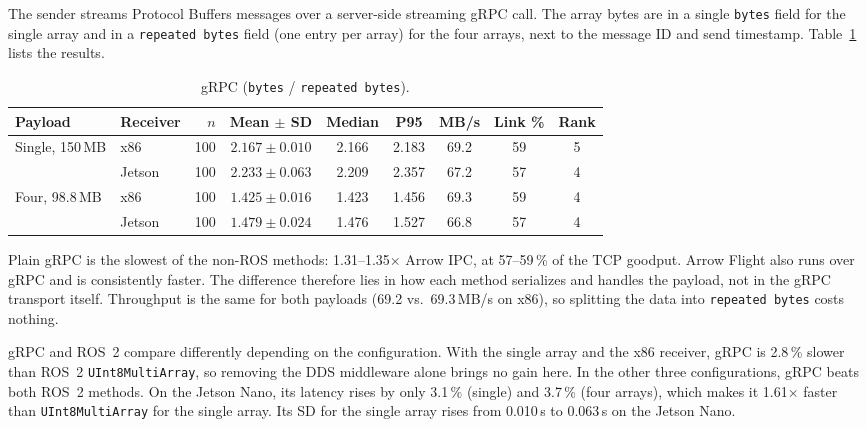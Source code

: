 The sender streams Protocol Buffers messages over a server-side streaming gRPC call.
The array bytes are in a single \texttt{bytes} field for the single array and in a
\texttt{repeated bytes} field (one entry per array) for the four arrays, next to the
message ID and send timestamp. Table~\ref{tab:grpc} lists the results.

\begin{table}[t]
  \centering
  \caption{gRPC (\texttt{bytes} / \texttt{repeated bytes}).}
  \label{tab:grpc}
  \small
  \setlength{\tabcolsep}{4pt}
  \begin{tabular}{llrcccccc}
    \toprule
    Payload & Receiver & $n$ & Mean $\pm$ SD & Median & P95 & MB/s & Link \% & Rank \\
    \midrule
    Single, 150\,MB & x86    & 100 & $2.167 \pm 0.010$ & 2.166 & 2.183 & 69.2 & 59 & 5 \\
                    & Jetson & 100 & $2.233 \pm 0.063$ & 2.209 & 2.357 & 67.2 & 57 & 4 \\
    \addlinespace
    Four, 98.8\,MB  & x86    & 100 & $1.425 \pm 0.016$ & 1.423 & 1.456 & 69.3 & 59 & 4 \\
                    & Jetson & 100 & $1.479 \pm 0.024$ & 1.476 & 1.527 & 66.8 & 57 & 4 \\
    \bottomrule
  \end{tabular}
\end{table}

Plain gRPC is the slowest of the non-ROS methods: 1.31--1.35$\times$ Arrow IPC, at
57--59\,\% of the TCP goodput. Arrow Flight also runs over gRPC and is consistently
faster. The difference therefore lies in how each method serializes and handles the
payload, not in the gRPC transport itself. Throughput is the same for both payloads (69.2 vs.\
69.3\,MB/s on x86), so splitting the data into \texttt{repeated bytes} costs nothing.

gRPC and ROS~2 compare differently depending on the configuration. With the single
array and the x86 receiver, gRPC is 2.8\,\% slower than ROS~2
\texttt{UInt8MultiArray}, so removing the DDS middleware alone brings no gain here. In
the other three configurations, gRPC beats both ROS~2 methods. On the Jetson Nano, its
latency rises by only 3.1\,\% (single) and 3.7\,\% (four arrays), which makes it
1.61$\times$ faster than \texttt{UInt8MultiArray} for the single array. Its SD for the
single array rises from 0.010\,s to 0.063\,s on the Jetson Nano.

